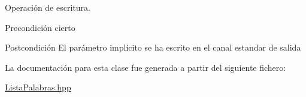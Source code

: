 Operación de escritura. 

\begin{DoxyPrecond}{Precondición}
cierto 
\end{DoxyPrecond}
\begin{DoxyPostcond}{Postcondición}
El parámetro implícito se ha escrito en el canal estandar de salida 
\end{DoxyPostcond}


La documentación para esta clase fue generada a partir del siguiente fichero\-:\begin{DoxyCompactItemize}
\item 
\hyperlink{_lista_palabras_8hpp}{Lista\-Palabras.\-hpp}\end{DoxyCompactItemize}

